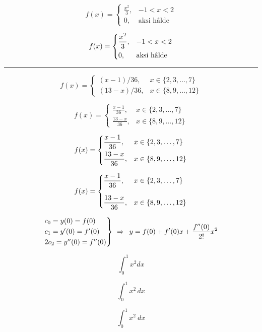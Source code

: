\documentclass{article}
\begin{document}
\[
f(x) =
\begin{cases} 
\displaystyle \frac{x^2}{3},	& -1 < x < 2 \\ 
0,						& \text{aksi hâlde} 
\end{cases}
\]

\[
f(x) =
\begin{dcases} 
\frac{x^2}{3},	& -1 < x < 2 \\ 
0,			& \text{aksi hâlde} 
\end{dcases}
\]

\bigskip
\hrule
\bigskip

\[
f(x) =
\begin{cases} 
(x-1)/36,		& x \in \{2, 3, \dots, 7\} \\
(13-x)/36,		& x \in \{8, 9, \dots, 12\} 
\end{cases}
\]

\[
f(x) =
\begin{cases} 
\frac{x - 1}{36},	& x \in \{2, 3, \dots, 7\} \\
\frac{13 - x}{36},	& x \in \{8, 9, \dots, 12\} 
\end{cases}
\]

\[
f(x) =
\begin{dcases} 
\frac{x - 1}{36},	& x \in \{2, 3, \dots, 7\} \\
\frac{13 - x}{36},	& x \in \{8, 9, \dots, 12\} 
\end{dcases}
\]

\[
f(x) =
\begin{dcases} 
\frac{x - 1}{36},	& x \in \{2, 3, \dots, 7\} \\[0.75 em]
\frac{13 - x}{36},	& x \in \{8, 9, \dots, 12\} 
\end{dcases}
\]

\newpage


\lipsum[1][1-3]
\[
\begin{rcases}
c_0 = y(0) = f(0) \\ 
c_1 = y'(0) = f'(0) \\ 
2 c_2 = y''(0) = f''(0)
\end{rcases}
\ \Rightarrow \enspace y = f(0) + f'(0)x + \frac{f''(0)}{2!}x^2
\]
\lipsum[1][4-6]

\newpage


\[
\int_0^1 x^2 dx
\]

\[
\int_0^1 x^2\, dx 
\]

\[
\int_0^1 x^2\ dx 
\]
\end{document}

